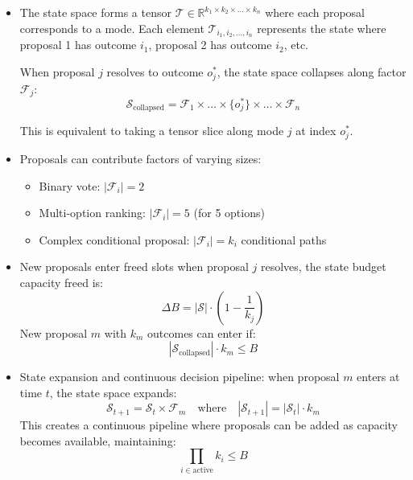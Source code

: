 \documentclass{article}
\begin{document}
\begin{itemize}
    \item The state space forms a tensor $\mathcal{T} \in \mathbb{R}^{k_1 \times k_2 \times \ldots \times k_n}$ where each proposal corresponds to a mode. Each element $\mathcal{T}_{i_1, i_2, \ldots, i_n}$ represents the state where proposal 1 has outcome $i_1$, proposal 2 has outcome $i_2$, etc.

    When proposal $j$ resolves to outcome $o_j^*$, the state space collapses along factor $\mathcal{F}_j$:
    \begin{equation}
    \mathcal{S}_{\text{collapsed}} = \mathcal{F}_1 \times \ldots \times \{o_j^*\} \times \ldots \times \mathcal{F}_n
    \end{equation}
    
    This is equivalent to taking a tensor slice along mode $j$ at index $o_j^*$.
    
    \item Proposals can contribute factors of varying sizes:
    \begin{itemize}
        \item Binary vote: $|\mathcal{F}_i| = 2$
        \item Multi-option ranking: $|\mathcal{F}_i| = 5$ (for 5 options)
        \item Complex conditional proposal: $|\mathcal{F}_i| = k_i$ conditional paths
    \end{itemize}

    \item New proposals enter freed slots when proposal $j$ resolves, the state budget capacity freed is:
    \begin{equation}
    \Delta B = |\mathcal{S}| \cdot \left(1 - \frac{1}{k_j}\right)
    \end{equation}
    New proposal $m$ with $k_m$ outcomes can enter if:
    \begin{equation}
    |\mathcal{S}_{\text{collapsed}}| \cdot k_m \leq B
    \end{equation}
    
    \item State expansion and continuous decision pipeline: when proposal $m$ enters at time $t$, the state space expands:
    \begin{equation}
    \mathcal{S}_{t+1} = \mathcal{S}_t \times \mathcal{F}_m \quad \text{where} \quad |\mathcal{S}_{t+1}| = |\mathcal{S}_t| \cdot k_m
    \end{equation}
    This creates a continuous pipeline where proposals can be added as capacity becomes available, maintaining:
    \begin{equation}
    \prod_{i \in \text{active}} k_i \leq B
    \end{equation}
        

\end{itemize}
\end{document}
